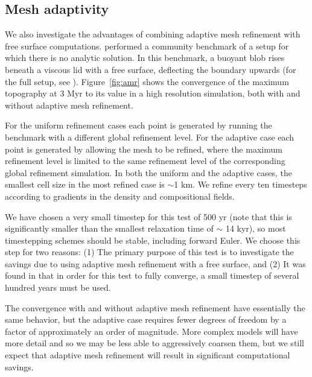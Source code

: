 \documentclass[preprint,12pt,authoryear]{elsarticle}
\begin{document}
\subsection{Mesh adaptivity}
\label{sec:mesh_adaptivity}

We also investigate the advantages of combining adaptive mesh refinement with free surface computations.
\citet{crameri2012comparison} performed a community benchmark of a setup for which there is no analytic
solution. In this benchmark, a buoyant blob rises beneath a viscous lid with a free surface, deflecting the
boundary upwards (for the full setup, see \citet{crameri2012comparison}). 
Figure~\ref{fig:amr} shows the convergence of the maximum topography at 3 Myr to its value in a high resolution simulation,
both with and without adaptive mesh refinement.

For the uniform refinement cases each point is generated by running the benchmark with a different global refinement level.
For the adaptive case each point is generated by allowing the mesh to be refined, where the maximum refinement level
is limited to the same refinement level of the corresponding global refinement simulation.
In both the uniform and the adaptive cases, the smallest cell size in the most refined case is $\sim$1 km.
We refine every ten timesteps according to gradients in the density and compositional fields.

We have chosen a very small timestep for this test of 500 yr (note that this is significantly smaller than the smallest
relaxation time of $\sim$ 14 kyr), so most timestepping schemes should be stable, including forward Euler.
We choose this step for two reasons: (1) The primary purpose of this test is to investigate the savings
due to using adaptive mesh refinement with a free surface, and (2) It was found in \citet{crameri2012comparison}
that in order for this test to fully converge, a small timestep of several hundred years must be used.

The convergence with and without adaptive mesh refinement have essentially the same behavior, but the adaptive case requires 
fewer degrees of freedom by a factor of approximately an order of magnitude. More complex models will have
more detail and so we may be less able to aggressively coarsen them, but we still expect that adaptive mesh refinement 
will result in significant computational savings.
\end{document}
